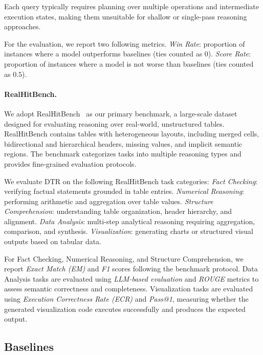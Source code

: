 Each query typically requires planning over multiple operations and intermediate execution states, making them unsuitable for shallow or single-pass reasoning approaches.

For the evaluation, we report two following metrics. \textit{Win Rate}: proportion of instances where a model outperforms baselines (ties counted as $0$). \textit{Score Rate}: proportion of instances where a model is not worse than baselines (ties counted as $0.5$).


\paragraph{RealHitBench.}
We adopt RealHitBench~\cite{wu2025realhitbench} as our primary benchmark, a large-scale dataset designed for evaluating reasoning over real-world, unstructured tables.
RealHitBench contains tables with heterogeneous layouts, including merged cells, bidirectional and hierarchical headers, missing values, and implicit semantic regions.
The benchmark categorizes tasks into multiple reasoning types and provides fine-grained evaluation protocols.

We evaluate DTR on the following RealHitBench task categories: \textit{Fact Checking}: verifying factual statements grounded in table entries. \textit{Numerical Reasoning}: performing arithmetic and aggregation over table values. \textit{Structure Comprehension}: understanding table organization, header hierarchy, and alignment. \textit{Data Analysis}: multi-step analytical reasoning requiring aggregation, comparison, and synthesis. \textit{Visualization}: generating charts or structured visual outputs based on tabular data.


For Fact Checking, Numerical Reasoning, and Structure Comprehension, we report \textit{Exact Match (EM)} and \textit{F1} scores following the benchmark protocol.
Data Analysis tasks are evaluated using \textit{LLM-based evaluation} and \textit{ROUGE} metrics to assess semantic correctness and completeness.
Visualization tasks are evaluated using \textit{Execution Correctness Rate (ECR)} and \textit{Pass@1}, measuring whether the generated visualization code executes successfully and produces the expected output.


\subsection{Baselines}
\label{sec:baselines}

